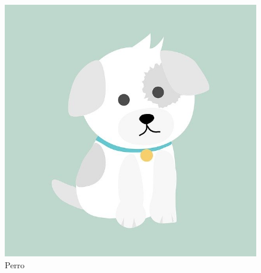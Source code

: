 \documentclass{article}
\begin{document}
\begin{figure}[h]
    \centering
    \includegraphics{dog2.jpg}
    \caption{Perro}
    \label{fig:perro1}
\end{figure}
\end{document}
